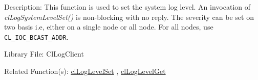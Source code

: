 \begin{Desc}
\item[Description:]This function is used to set the system log level. An invocation of \textit{clLogSystemLevelSet()}
is non-blocking with no reply. The severity can be set on two basis i.e, either on a single node or all node. For all nodes, use
{\tt CL\_\-IOC\_\-BCAST\_\-ADDR}.\end{Desc}
\begin{Desc}
\item[Library File:]Cl\-Log\-Client\end{Desc}
\begin{Desc}
\item[Related Function(s):]\hyperlink{pagelog103}{cl\-Log\-Level\-Set} , \hyperlink{pagelog104}{cl\-Log\-Level\-Get} \end{Desc}
\newpage


